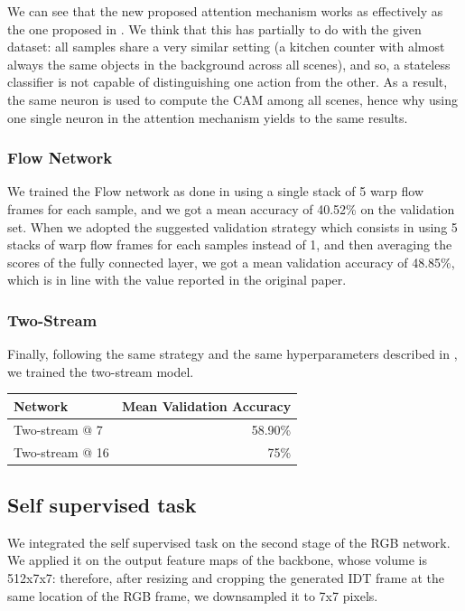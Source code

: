 \documentclass[10pt,twocolumn,letterpaper]{article}
\begin{document}
We can see that the new proposed attention mechanism works as effectively as the one proposed in \cite{Ego-RNN}. We think that this has partially to do with the given dataset: all samples share a very similar setting (a kitchen counter with almost always the same objects in the background across all scenes), and so, a stateless classifier is not capable of distinguishing one action from the other. As a result, the same neuron is used to compute the CAM among all scenes, hence why using one single neuron in the attention mechanism yields to the same results.

\subsubsection{Flow Network}

We trained the Flow network as done in \cite{Ego-RNN} using a single stack of 5 warp flow frames for each sample, and we got a mean accuracy of 40.52\% on the validation set. When we adopted the suggested validation strategy which consists in using 5 stacks of warp flow frames for each samples instead of 1, and then averaging the scores of the fully connected layer, we got a mean validation accuracy of 48.85\%, which is in line with the value reported in the original paper.

\subsubsection{Two-Stream}

Finally, following the same strategy and the same hyperparameters described in \cite{Ego-RNN}, we trained the two-stream model.

\vspace{12pt} \noindent
\begin{tabular}{l|r}
	Network & Mean Validation Accuracy \\
	\hline
	Two-stream @ 7 & 58.90\% \\
	Two-stream @ 16 & 75\%
\end{tabular} \vspace{6pt}

\subsection{Self supervised task}

We integrated the self supervised task on the second stage of the RGB network. We applied it on the output feature maps of the backbone, whose volume is 512x7x7: therefore, after resizing and cropping the generated IDT frame at the same location of the RGB frame, we downsampled it to 7x7 pixels.
\end{document}
